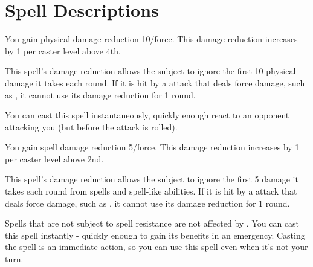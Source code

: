 \section{Spell Descriptions}

\begin{comment}
\subsubsection{A}
\end{comment}

\begin{spelleffect}
  You gain physical damage reduction 10/force. This damage reduction increases by 1 per caster level above 4th.
\end{spelleffect}
\begin{spellnotes}
  This spell's damage reduction allows the subject to ignore the first 10 physical damage it takes each round. If it is hit by a attack that deals force damage, such as , it cannot use its damage reduction for 1 round.

  You can cast this spell instantaneously, quickly enough react to an opponent attacking you (but before the attack is rolled).
\end{spellnotes}

\spellrng{\rngpers}
\begin{spelleffect}
  You gain spell damage reduction 5/force. This damage reduction increases by 1 per caster level above 2nd.
\end{spelleffect}
\begin{spellnotes}
  This spell's damage reduction allows the subject to ignore the first 5 damage it takes each round from spells and spell-like abilities. If it is hit by a attack that deals force damage, such as , it cannot use its damage reduction for 1 round.
  
  Spells that are not subject to spell resistance are not affected by . You can cast this spell instantly - quickly enough to gain its benefits in an emergency. Casting the spell is an immediate action, so you can use this spell even when it's not your turn.
\end{spellnotes}

